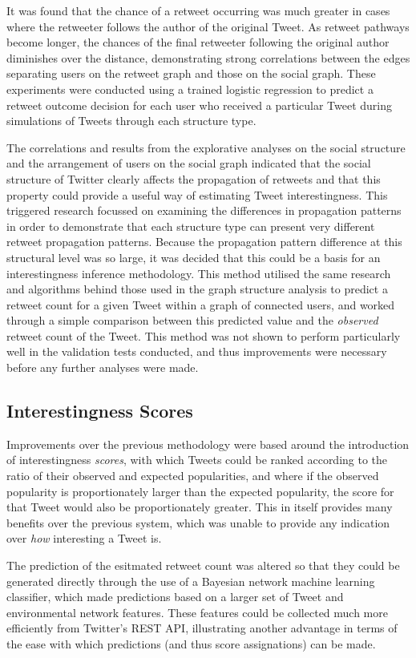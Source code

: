 It was found that the chance of a retweet occurring was much greater in cases where the retweeter follows the author of the original Tweet. As retweet pathways become longer, the chances of the final retweeter following the original author diminishes over the distance, demonstrating strong correlations between the edges separating users on the retweet graph and those on the social graph. These experiments were conducted using a trained logistic regression to predict a retweet outcome decision for each user who received a particular Tweet during simulations of Tweets through each structure type.

The correlations and results from the explorative analyses on the social structure and the arrangement of users on the social graph indicated that the social structure of Twitter clearly affects the propagation of retweets and that this property could provide a useful way of estimating Tweet interestingness. This triggered research focussed on examining the differences in propagation patterns in order to demonstrate that each structure type can present very different retweet propagation patterns. Because the propagation pattern difference at this structural level was so large, it was decided that this could be a basis for an interestingness inference methodology. This method utilised the same research and algorithms behind those used in the graph structure analysis to predict a retweet count for a given Tweet within a graph of connected users, and worked through a simple comparison between this predicted value and the \textit{observed} retweet count of the Tweet. This method was not shown to perform particularly well in the validation tests conducted, and thus improvements were necessary before any further analyses were made.


\subsection{Interestingness Scores}
Improvements over the previous methodology were based around the introduction of interestingness \textit{scores}, with which Tweets could be ranked according to the ratio of their observed and expected popularities, and where if the observed popularity is proportionately larger than the expected popularity, the score for that Tweet would also be proportionately greater. This in itself provides many benefits over the previous system, which was unable to provide any indication over \textit{how} interesting a Tweet is.

The prediction of the esitmated retweet count was altered so that they could be generated directly through the use of a Bayesian network machine learning classifier, which made predictions based on a larger set of Tweet and environmental network features. These features could be collected much more efficiently from Twitter's REST API, illustrating another advantage in terms of the ease with which predictions (and thus score assignations) can be made. 


